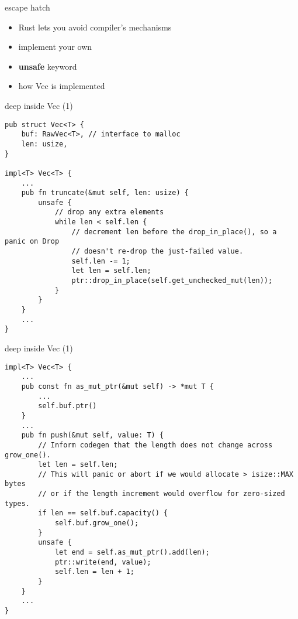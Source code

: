 
\begin{frame}{escape hatch}
    \begin{itemize}
    \item Rust lets you avoid compiler's mechanisms
    \item implement your own
    \item \textbf{unsafe} keyword
    \item how Vec is implemented
    \end{itemize}
\end{frame}

\begin{frame}[fragile,label=insideVec1]{deep inside Vec (1)}
\begin{verbatim}
pub struct Vec<T> {
    buf: RawVec<T>, // interface to malloc
    len: usize,
}

impl<T> Vec<T> {
    ...
    pub fn truncate(&mut self, len: usize) {
        unsafe {
            // drop any extra elements
            while len < self.len {
                // decrement len before the drop_in_place(), so a panic on Drop
                // doesn't re-drop the just-failed value.
                self.len -= 1;
                let len = self.len;
                ptr::drop_in_place(self.get_unchecked_mut(len));
            }
        }
    }
    ...
}
\end{verbatim}
\end{frame}


\begin{frame}[fragile,label=insideVec1]{deep inside Vec (1)}
\begin{verbatim}
impl<T> Vec<T> {
    ...
    pub const fn as_mut_ptr(&mut self) -> *mut T {
        ...
        self.buf.ptr()
    }
    ...
    pub fn push(&mut self, value: T) {
        // Inform codegen that the length does not change across grow_one().
        let len = self.len;
        // This will panic or abort if we would allocate > isize::MAX bytes
        // or if the length increment would overflow for zero-sized types.
        if len == self.buf.capacity() {
            self.buf.grow_one();
        }
        unsafe {
            let end = self.as_mut_ptr().add(len);
            ptr::write(end, value);
            self.len = len + 1;
        }
    }
    ...
}
\end{verbatim}
\end{frame}


